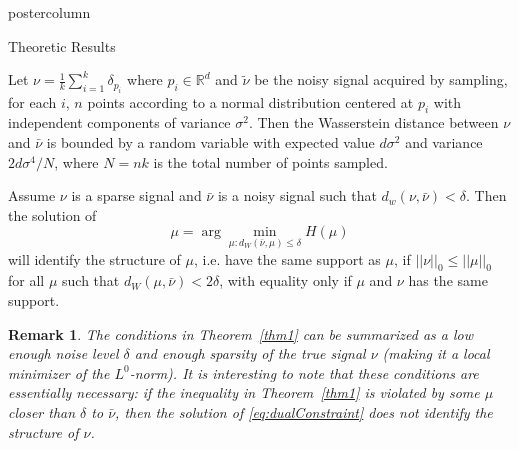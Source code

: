 \documentclass{beamer}
\newtheorem*{remark}{Remark}
\begin{document}
\begin{frame}
\begin{columns}
\begin{column}{.5\textwidth}
\begin{beamercolorbox}[center]{postercolumn}
\begin{minipage}{.98\textwidth}
{%
    

    					\begin{myblock}{Theoretic Results}

\begin{theorem}
Let $\nu = \frac{1}{k}\sum_{i=1}^k \delta_{p_i}$ where $p_i\in \mathbb R^d$ and $\tilde\nu$ be the noisy signal acquired by sampling, for each $i$, $n$ points according to a normal distribution centered at $p_i$ with independent components of variance $\sigma^2$. Then the Wasserstein distance between $\nu$ and $\bar\nu$ is bounded by a random variable with expected value $d\sigma^2$ and variance $2d\sigma^4/N$,  where $N=nk$ is the total number of points sampled.  
\end{theorem}

\begin{theorem}
    \label{thm1}
    Assume $\nu$ is a sparse signal and $\bar\nu$ is a noisy signal such that 
    $d_w(\nu,\bar\nu) < \delta $. Then the solution of 
    \begin{equation*} \label{eq:dualConstraint} 
        \mu=\arg\min_{\mu : d_W(\bar\nu,\mu) \le \delta} H(\mu) 
    \end{equation*} 
    will identify the structure of $\mu$, i.e. have the same support as $\mu$, if $||\nu||_0 \leq ||\mu||_0$ for all $\mu$ such that $d_W(\mu,\bar\nu)<2\delta$, with equality only if $\mu$ and $\nu$ has the same support.  
\end{theorem}

\begin{remark}
    \quad The conditions in Theorem~\ref{thm1} can be summarized as a low enough noise level $\delta$ and enough sparsity of the true signal $\nu$ (making it a local minimizer of the $L^0$-norm). It is interesting to note that these conditions are essentially necessary: if the inequality in Theorem~\ref{thm1} is violated by some $\mu$ closer than $\delta$ to $\bar\nu$, then the solution of \eqref{eq:dualConstraint} does not identify the structure of $\nu$. 


\end{remark}
\end{myblock}}
\end{minipage}
\end{beamercolorbox}
\end{column}
\end{columns}
\end{frame}
\end{document}
